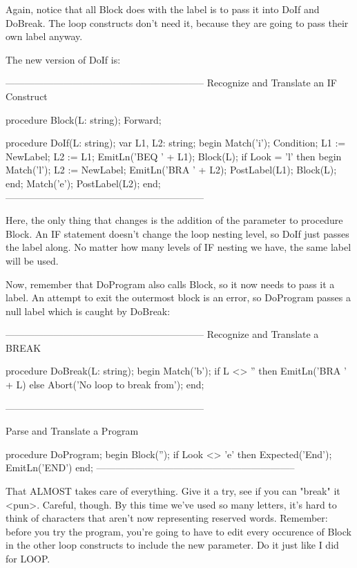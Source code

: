 \documentclass[float=false, crop=false]{standalone}
\begin{document}
Again, notice that all Block does with the label is to pass it into DoIf and
DoBreak. The loop constructs don't need it, because they are going to pass their
own label anyway.

The new version of DoIf is:

\begin{code}
{--------------------------------------------------------------}
{ Recognize and Translate an IF Construct }

procedure Block(L: string); Forward;


procedure DoIf(L: string);
var L1, L2: string;
begin
   Match('i');
   Condition;
   L1 := NewLabel;
   L2 := L1;
   EmitLn('BEQ ' + L1);
   Block(L);
   if Look = 'l' then begin
      Match('l');
      L2 := NewLabel;
      EmitLn('BRA ' + L2);
      PostLabel(L1);
      Block(L);
   end;
   Match('e');
   PostLabel(L2);
end;
{--------------------------------------------------------------}
\end{code}

Here, the only thing that changes is the addition of the parameter to procedure
Block. An IF statement doesn't change the loop nesting level, so DoIf just
passes the label along. No matter how many levels of IF nesting we have, the
same label will be used.

Now, remember that DoProgram also calls Block, so it now needs to pass it a
label. An attempt to exit the outermost block is an error, so DoProgram passes a
null label which is caught by DoBreak:

\begin{code}
{--------------------------------------------------------------}
{ Recognize and Translate a BREAK }

procedure DoBreak(L: string);
begin
   Match('b');
   if L <> '' then
      EmitLn('BRA ' + L)
   else Abort('No loop to break from');
end;


{--------------------------------------------------------------}

{ Parse and Translate a Program }

procedure DoProgram;
begin
   Block('');
   if Look <> 'e' then Expected('End');
   EmitLn('END')
end;
{--------------------------------------------------------------}
\end{code}

That ALMOST takes care of everything. Give it a try, see if you can "break" it
<pun>. Careful, though. By this time we've used so many letters, it's hard to
think of characters that aren't now representing reserved words. Remember:
before you try the program, you're going to have to edit every occurence of
Block in the other loop constructs to include the new parameter. Do it just like
I did for LOOP.
\end{document}

